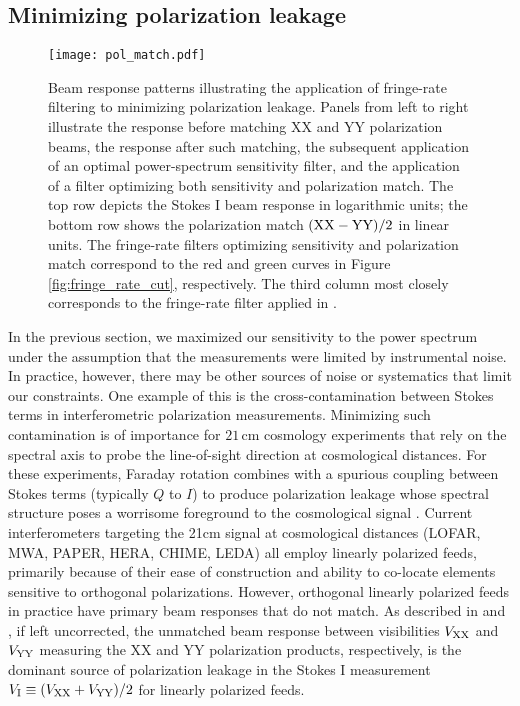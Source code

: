 \documentclass[twocolumn,apj,numberedappendix]{emulateapj}
\begin{document}
\subsection{Minimizing polarization leakage}
\label{sec:polbeams}
\def\VXX{{V_{\rm XX}}}
\def\VYY{{V_{\rm YY}}}
\def\VI{{V_{\rm I}}}
\def\VQ{{V_{\rm Q}}}

\begin{figure*}\centering
\texttt{[image: pol\_match.pdf]}
\caption{
Beam response patterns illustrating the application of fringe-rate filtering to minimizing polarization leakage.
Panels from left to right illustrate the
response before matching XX and YY polarization beams, the response after such matching, 
the subsequent application of an optimal power-spectrum sensitivity filter, and the
application of a filter optimizing both sensitivity and polarization match.
The top row depicts the Stokes I beam response in logarithmic units; the
bottom row shows the polarization match ${\rm (XX-YY)}/2$ in linear units.
The fringe-rate filters optimizing sensitivity and polarization match correspond
to the red and green curves in Figure \ref{fig:fringe_rate_cut}, respectively.
The third column most closely corresponds to the fringe-rate filter applied in \citet{ali_et_al2015}.
}\label{fig:pol_match}
\end{figure*}

In the previous section, we maximized our sensitivity to the power spectrum under the assumption that the measurements were limited by instrumental noise. In practice, however, there may be other sources of noise or systematics that limit our constraints. One example of this is the cross-contamination between Stokes terms in interferometric polarization measurements. Minimizing such contamination is of importance for $21\,\textrm{cm}$ cosmology experiments that rely on
the spectral axis to probe the line-of-sight direction at cosmological distances.  For these
experiments, Faraday rotation combines
with a spurious coupling between Stokes terms (typically $Q$ to $I$) to produce polarization leakage whose 
spectral structure poses a worrisome foreground
to the cosmological signal \citep{jelic_et_al2008,jelic_et_al2010,jelic_et_al2014,bernardi_et_al2013,moore_et_al2013,moore_et_al2015}.  Current interferometers
targeting the 21cm signal at cosmological distances (LOFAR, MWA, PAPER, HERA, CHIME, LEDA) all employ linearly
polarized feeds, primarily because of their ease of construction and ability to co-locate elements sensitive to
orthogonal polarizations.  However, orthogonal linearly polarized feeds in practice have primary beam responses
that do not match.  As described in \citet{moore_et_al2013} and \citet{jelic_et_al2010}, if left uncorrected, the unmatched beam response 
between visibilities $\VXX$ and $\VYY$ measuring the XX and YY polarization products, respectively, is the 
dominant source of polarization leakage in the Stokes I measurement $\VI\equiv(\VXX+\VYY)/2$ for
linearly polarized feeds.
\end{document}
